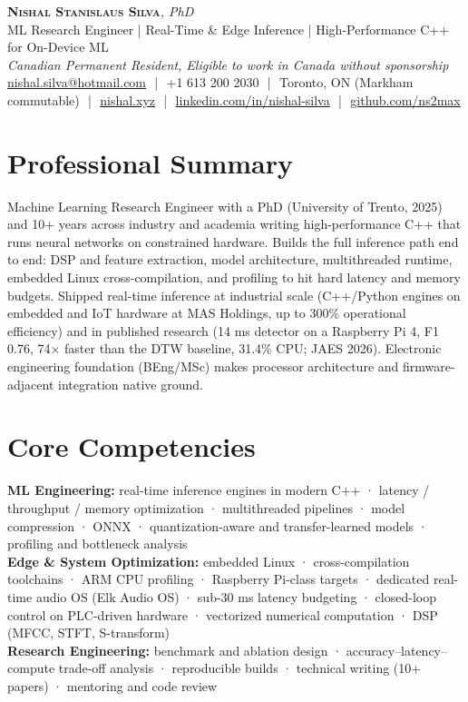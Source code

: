 \documentclass[11pt]{article}
\makeatletter
\newcommand{\cvName}{Nishal Stanislaus Silva}
\newcommand{\cvEmail}{nishal.silva@hotmail.com}
\newcommand{\cvPhone}{+1 613 200 2030}
\newcommand{\cvCity}{Toronto, ON}
\newcommand{\cvSite}{https://nishal.xyz}
\newcommand{\cvLinkedIn}{https://www.linkedin.com/in/nishal-silva}
\newcommand{\cvGitHub}{https://github.com/ns2max}
\newcommand{\cvStatus}{Canadian Permanent Resident, Eligible to work in Canada without sponsorship}
\newcommand{\cvTagline}{ML Research Engineer | Real-Time \& Edge Inference | High-Performance C++ for On-Device ML}
\makeatother
\begin{document}
\pagestyle{empty}

\begin{center}
    {\LARGE \scshape \textbf{\cvName}}{\large \textit{, PhD}}
    \\[1pt]
    {\small \cvTagline}
    \\[1pt]
    {\footnotesize\textit{\cvStatus}}
    \\[1pt]
    {\small
    \href{mailto:\cvEmail}{\cvEmail}
    \,\,|\,\, \cvPhone
    \,\,|\,\, \cvCity{} (Markham commutable)
    \,\,|\,\, \href{\cvSite}{nishal.xyz}
    \,\,|\,\, \href{\cvLinkedIn}{linkedin.com/in/nishal-silva}
    \,\,|\,\, \href{\cvGitHub}{github.com/ns2max}}
\end{center}

\section*{Professional Summary}

Machine Learning Research Engineer with a PhD (University of Trento, 2025) and 10+ years across industry and academia writing high-performance C++ that runs neural networks on constrained hardware. Builds the full inference path end to end: DSP and feature extraction, model architecture, multithreaded runtime, embedded Linux cross-compilation, and profiling to hit hard latency and memory budgets. Shipped real-time inference at industrial scale (C++/Python engines on embedded and IoT hardware at MAS Holdings, up to 300\% operational efficiency) and in published research (14 ms detector on a Raspberry Pi 4, F1 0.76, 74$\times$ faster than the DTW baseline, 31.4\% CPU; JAES 2026). Electronic engineering foundation (BEng/MSc) makes processor architecture and firmware-adjacent integration native ground.

\section*{Core Competencies}

\textbf{ML Engineering:} real-time inference engines in modern C++ · latency / throughput / memory optimization · multithreaded pipelines · model compression · ONNX · quantization-aware and transfer-learned models · profiling and bottleneck analysis\\
\textbf{Edge \& System Optimization:} embedded Linux · cross-compilation toolchains · ARM CPU profiling · Raspberry Pi-class targets · dedicated real-time audio OS (Elk Audio OS) · sub-30 ms latency budgeting · closed-loop control on PLC-driven hardware · vectorized numerical computation · DSP (MFCC, STFT, S-transform)\\
\textbf{Research Engineering:} benchmark and ablation design · accuracy--latency--compute trade-off analysis · reproducible builds · technical writing (10+ papers) · mentoring and code review
\end{document}
